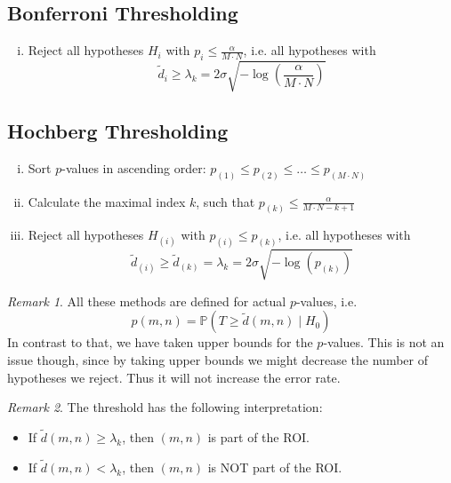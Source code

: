 \documentclass[a4paper,12pt]{article}
\theoremstyle{plain}
\theoremstyle{definition}
\theoremstyle{remark}
\newtheorem{remark}{Remark}
\begin{document}
\subsection{Bonferroni Thresholding}
\begin{enumerate}[(i)]
	\item Reject all hypotheses $H_{i}$ with $p_{i} \leq \frac{\alpha}{M \cdot N}$, i.e. all hypotheses with $$\tilde{d}_{i} \geq \lambda_k = 2 \sigma \sqrt{- \log \left( \frac{\alpha}{M \cdot N} \right)}$$
\end{enumerate}

\subsection{Hochberg Thresholding}
\begin{enumerate}[(i)]
	\item Sort $p$-values in ascending order: $p_{(1)} \leq p_{(2)} \leq \dots \leq p_{(M \cdot N)}$
	\item Calculate the maximal index $k$, such that $p_{(k)} \leq \frac{\alpha}{M \cdot N - k + 1}$
	\item Reject all hypotheses $H_{(i)}$ with $p_{(i)} \leq p_{(k)}$, i.e. all hypotheses with $$\tilde{d}_{(i)} \geq \tilde{d}_{(k)} = \lambda_{k} = 2 \sigma \sqrt{- \log(p_{(k)})}$$
\end{enumerate}

\begin{remark}
	All these methods are defined for actual $p$-values, i.e.
	\begin{equation*}
		p(m, n) = \mathbb{P}(T \geq \tilde{d}(m, n) \mid H_0)
	\end{equation*}
	In contrast to that, we have taken upper bounds for the $p$-values. This is not an issue though, since by taking upper bounds we might decrease the number of hypotheses we reject. Thus it will not increase the error rate.
\end{remark}

\begin{remark}
	The threshold has the following interpretation:
	\begin{itemize}
		\item If $\tilde{d}(m, n) \geq \lambda_{k}$, then $(m, n)$ is part of the ROI.
		\item If $\tilde{d}(m, n) < \lambda_{k}$, then $(m, n)$ is NOT part of the ROI.
	\end{itemize}
\end{remark}
\end{document}
